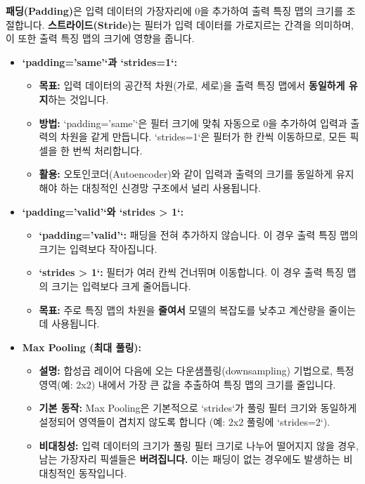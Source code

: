 \documentclass[11pt,a4paper]{article}
\begin{document}
\begin{tcolorbox}[mybox, title=패딩과 스트라이드의 역할]
\textbf{패딩(Padding)}은 입력 데이터의 가장자리에 0을 추가하여 출력 특징 맵의 크기를 조절합니다.
\textbf{스트라이드(Stride)}는 필터가 입력 데이터를 가로지르는 간격을 의미하며, 이 또한 출력 특징 맵의 크기에 영향을 줍니다.
\end{tcolorbox}

\begin{itemize}
    \item \textbf{`padding='same'`과 `strides=1`:}
    \begin{itemize}
        \item \textbf{목표:} 입력 데이터의 공간적 차원(가로, 세로)을 출력 특징 맵에서 \textbf{동일하게 유지}하는 것입니다.
        \item \textbf{방법:} `padding='same'`은 필터 크기에 맞춰 자동으로 0을 추가하여 입력과 출력의 차원을 같게 만듭니다. `strides=1`은 필터가 한 칸씩 이동하므로, 모든 픽셀을 한 번씩 처리합니다.
        \item \textbf{활용:} 오토인코더(Autoencoder)와 같이 입력과 출력의 크기를 동일하게 유지해야 하는 대칭적인 신경망 구조에서 널리 사용됩니다.
    \end{itemize}
    \item \textbf{`padding='valid'`와 `strides > 1`:}
    \begin{itemize}
        \item \textbf{`padding='valid'`:} 패딩을 전혀 추가하지 않습니다. 이 경우 출력 특징 맵의 크기는 입력보다 작아집니다.
        \item \textbf{`strides > 1`:} 필터가 여러 칸씩 건너뛰며 이동합니다. 이 경우 출력 특징 맵의 크기는 입력보다 크게 줄어듭니다.
        \item \textbf{목표:} 주로 특징 맵의 차원을 \textbf{줄여서} 모델의 복잡도를 낮추고 계산량을 줄이는 데 사용됩니다.
    \end{itemize}
    \item \textbf{Max Pooling (최대 풀링):}
    \begin{itemize}
        \item \textbf{설명:} 합성곱 레이어 다음에 오는 다운샘플링(downsampling) 기법으로, 특정 영역(예: 2x2) 내에서 가장 큰 값을 추출하여 특징 맵의 크기를 줄입니다.
        \item \textbf{기본 동작:} Max Pooling은 기본적으로 `strides`가 풀링 필터 크기와 동일하게 설정되어 영역들이 겹치지 않도록 합니다 (예: 2x2 풀링에 `strides=2`).
        \item \textbf{비대칭성:} 입력 데이터의 크기가 풀링 필터 크기로 나누어 떨어지지 않을 경우, 남는 가장자리 픽셀들은 \textbf{버려집니다.} 이는 패딩이 없는 경우에도 발생하는 비대칭적인 동작입니다.

\end{itemize}
\end{itemize}
\end{document}
